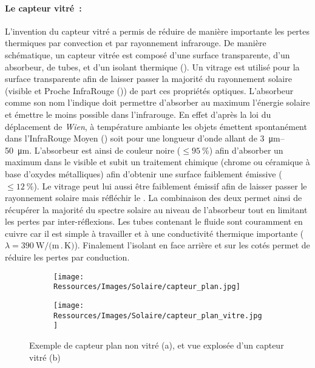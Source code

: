 \paragraph{Le capteur vitré~:} %
\label{par:le_capteur_vitre}
L’invention du capteur vitré a permis de réduire de manière importante les pertes
thermiques par convection et par rayonnement infrarouge. De manière schématique, un
capteur vitrée est composé d’une surface transparente, d’un absorbeur, de tubes, et d’un
isolant thermique (). Un vitrage est utilisé pour la
surface transparente afin de laisser passer la majorité du rayonnement solaire (visible et
Proche InfraRouge ()) de part ces propriétés optiques. L’absorbeur comme son nom
l’indique doit permettre d’absorber au maximum l’énergie solaire et émettre le moins possible dans
l’infrarouge. En effet d’après la loi du déplacement de \textit{Wien}, à température
ambiante les objets émettent spontanément dans l’InfraRouge Moyen () soit pour
une longueur d’onde allant de \SIrange{3}{50}{\micro\metre}. L’absorbeur est ainsi de
couleur noire ($\leq \SI{95}{\percent}$) afin d’absorber un maximum dans le visible et
subit un traitement chimique (chrome ou céramique à base d’oxydes métalliques) afin
d’obtenir une surface faiblement émissive ($\leq \SI{12}{\percent}$). Le vitrage peut lui
aussi être faiblement émissif afin de laisser passer le rayonnement solaire mais réfléchir
le . La combinaison des deux permet ainsi de récupérer la majorité du spectre
solaire au niveau de l’absorbeur tout en limitant les pertes par inter-réflexions. Les
tubes contenant le fluide sont couramment en cuivre car il est simple à travailler et à
une conductivité thermique importante ($\lambda = \SI{390}{\watt\per(\metre\period\kelvin)}$).
Finalement l’isolant en face arrière et sur les cotés permet de réduire les pertes par conduction.

\begin{figure}
    \centering
    \begin{subfigure}[b]{0.35\textwidth}
        \texttt{[image: Ressources/Images/Solaire/capteur\_plan.jpg]}
        \caption{}
        \label{fig:capteur_plan}
    \end{subfigure}
    \quad
    \begin{subfigure}[b]{0.55\textwidth}
        \texttt{[image: Ressources/Images/Solaire/capteur\_plan\_vitre.jpg]}
        \caption{}
        \label{fig:capteur_plan_vitre}
    \end{subfigure}
    \caption[Description des capteurs plans]
             {Exemple de capteur plan non vitré (a), et vue explosée d’un capteur vitré (b)}
    \label{fig:capteurs_plan}
\end{figure}


